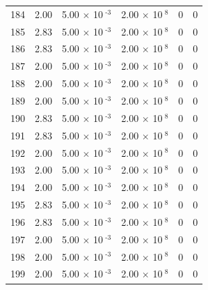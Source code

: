 \documentclass[a4paper,11pt]{article}
\begin{document}
\begin{center}
\begin{longtable}{|R{1.5cm}|R{2.4cm}|R{2.4cm}|R{2.4cm}|R{2.4cm}|R{2.4cm}|}
  184 &   2.00  &         5.00 $\times$ 10$^{\text{          -3}}$  &         2.00 $\times$ 10$^{\text{           8}}$  & 0  & 0 \\
  185 &   2.83  &         5.00 $\times$ 10$^{\text{          -3}}$  &         2.00 $\times$ 10$^{\text{           8}}$  & 0  & 0 \\
  186 &   2.83  &         5.00 $\times$ 10$^{\text{          -3}}$  &         2.00 $\times$ 10$^{\text{           8}}$  & 0  & 0 \\
  187 &   2.00  &         5.00 $\times$ 10$^{\text{          -3}}$  &         2.00 $\times$ 10$^{\text{           8}}$  & 0  & 0 \\
  188 &   2.00  &         5.00 $\times$ 10$^{\text{          -3}}$  &         2.00 $\times$ 10$^{\text{           8}}$  & 0  & 0 \\
  189 &   2.00  &         5.00 $\times$ 10$^{\text{          -3}}$  &         2.00 $\times$ 10$^{\text{           8}}$  & 0  & 0 \\
  190 &   2.83  &         5.00 $\times$ 10$^{\text{          -3}}$  &         2.00 $\times$ 10$^{\text{           8}}$  & 0  & 0 \\
  191 &   2.83  &         5.00 $\times$ 10$^{\text{          -3}}$  &         2.00 $\times$ 10$^{\text{           8}}$  & 0  & 0 \\
  192 &   2.00  &         5.00 $\times$ 10$^{\text{          -3}}$  &         2.00 $\times$ 10$^{\text{           8}}$  & 0  & 0 \\
  193 &   2.00  &         5.00 $\times$ 10$^{\text{          -3}}$  &         2.00 $\times$ 10$^{\text{           8}}$  & 0  & 0 \\
  194 &   2.00  &         5.00 $\times$ 10$^{\text{          -3}}$  &         2.00 $\times$ 10$^{\text{           8}}$  & 0  & 0 \\
  195 &   2.83  &         5.00 $\times$ 10$^{\text{          -3}}$  &         2.00 $\times$ 10$^{\text{           8}}$  & 0  & 0 \\
  196 &   2.83  &         5.00 $\times$ 10$^{\text{          -3}}$  &         2.00 $\times$ 10$^{\text{           8}}$  & 0  & 0 \\
  197 &   2.00  &         5.00 $\times$ 10$^{\text{          -3}}$  &         2.00 $\times$ 10$^{\text{           8}}$  & 0  & 0 \\
  198 &   2.00  &         5.00 $\times$ 10$^{\text{          -3}}$  &         2.00 $\times$ 10$^{\text{           8}}$  & 0  & 0 \\
  199 &   2.00  &         5.00 $\times$ 10$^{\text{          -3}}$  &         2.00 $\times$ 10$^{\text{           8}}$  & 0  & 0 \\

\end{longtable}
\end{center}
\end{document}
